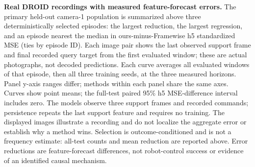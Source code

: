 \textbf{Real DROID recordings with measured feature-forecast errors.}
The primary held-out camera-1 population is summarized above three deterministically
selected episodes: the largest reduction, the largest regression, and an episode nearest the median in ours-minus-Framewise h5 standardized MSE
(ties by episode ID).
Each image pair shows the last observed support frame and final recorded query
target from the first evaluated window; these are actual photographs, not decoded
predictions. Each curve averages all evaluated windows of that episode, then all
three training seeds, at the three measured horizons. Panel y-axis ranges differ;
methods within each panel share the same axes. Curves show point means; the full-test paired 95\% h5 MSE-difference interval includes zero. The models observe three support
frames and recorded commands; persistence repeats the last support feature and
requires no training. The displayed images illustrate a recording and do
not localize the aggregate error or establish why a method wins. Selection is
outcome-conditioned and is not a frequency estimate: all-test counts and mean
reduction are reported above. Error reductions are feature-forecast differences,
not robot-control success or evidence of an identified causal mechanism.
